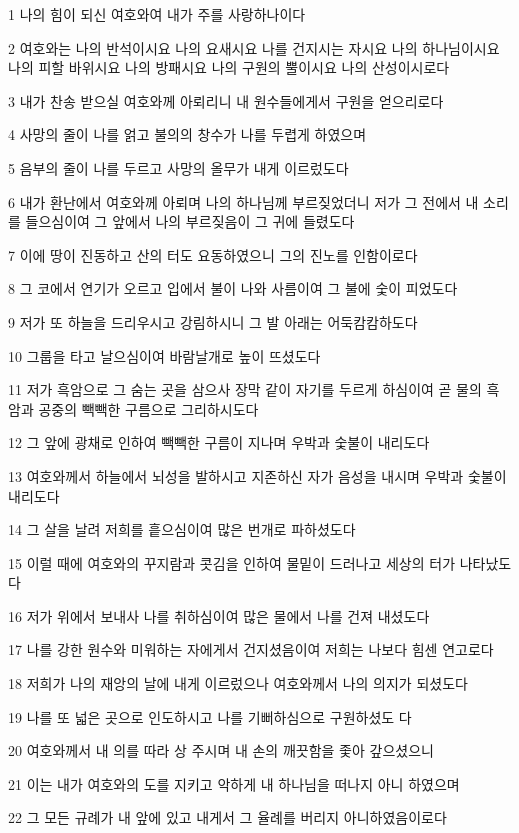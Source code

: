 \par 1 나의 힘이 되신 여호와여 내가 주를 사랑하나이다
\par 2 여호와는 나의 반석이시요 나의 요새시요 나를 건지시는 자시요 나의 하나님이시요 나의 피할 바위시요 나의 방패시요 나의 구원의 뿔이시요 나의 산성이시로다
\par 3 내가 찬송 받으실 여호와께 아뢰리니 내 원수들에게서 구원을 얻으리로다
\par 4 사망의 줄이 나를 얽고 불의의 창수가 나를 두렵게 하였으며
\par 5 음부의 줄이 나를 두르고 사망의 올무가 내게 이르렀도다
\par 6 내가 환난에서 여호와께 아뢰며 나의 하나님께 부르짖었더니 저가 그 전에서 내 소리를 들으심이여 그 앞에서 나의 부르짖음이 그 귀에 들렸도다
\par 7 이에 땅이 진동하고 산의 터도 요동하였으니 그의 진노를 인함이로다
\par 8 그 코에서 연기가 오르고 입에서 불이 나와 사름이여 그 불에 숯이 피었도다
\par 9 저가 또 하늘을 드리우시고 강림하시니 그 발 아래는 어둑캄캄하도다
\par 10 그룹을 타고 날으심이여 바람날개로 높이 뜨셨도다
\par 11 저가 흑암으로 그 숨는 곳을 삼으사 장막 같이 자기를 두르게 하심이여 곧 물의 흑암과 공중의 빽빽한 구름으로 그리하시도다
\par 12 그 앞에 광채로 인하여 빽빽한 구름이 지나며 우박과 숯불이 내리도다
\par 13 여호와께서 하늘에서 뇌성을 발하시고 지존하신 자가 음성을 내시며 우박과 숯불이 내리도다
\par 14 그 살을 날려 저희를 흩으심이여 많은 번개로 파하셨도다
\par 15 이럴 때에 여호와의 꾸지람과 콧김을 인하여 물밑이 드러나고 세상의 터가 나타났도다
\par 16 저가 위에서 보내사 나를 취하심이여 많은 물에서 나를 건져 내셨도다
\par 17 나를 강한 원수와 미워하는 자에게서 건지셨음이여 저희는 나보다 힘센 연고로다
\par 18 저희가 나의 재앙의 날에 내게 이르렀으나 여호와께서 나의 의지가 되셨도다
\par 19 나를 또 넓은 곳으로 인도하시고 나를 기뻐하심으로 구원하셨도 다
\par 20 여호와께서 내 의를 따라 상 주시며 내 손의 깨끗함을 좇아 갚으셨으니
\par 21 이는 내가 여호와의 도를 지키고 악하게 내 하나님을 떠나지 아니 하였으며
\par 22 그 모든 규례가 내 앞에 있고 내게서 그 율례를 버리지 아니하였음이로다
